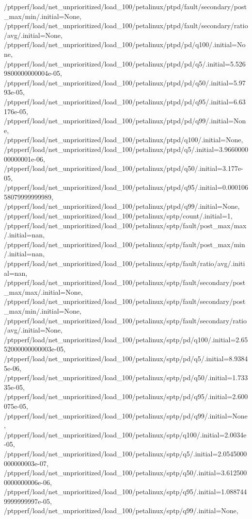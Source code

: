 {    /ptpperf/load/net_unprioritized/load_100/petalinux/ptpd/fault/secondary/post_max/min/.initial=None,
    /ptpperf/load/net_unprioritized/load_100/petalinux/ptpd/fault/secondary/ratio/avg/.initial=None,
    /ptpperf/load/net_unprioritized/load_100/petalinux/ptpd/pd/q100/.initial=None,
    /ptpperf/load/net_unprioritized/load_100/petalinux/ptpd/pd/q5/.initial=5.5269800000000004e-05,
    /ptpperf/load/net_unprioritized/load_100/petalinux/ptpd/pd/q50/.initial=5.9793e-05,
    /ptpperf/load/net_unprioritized/load_100/petalinux/ptpd/pd/q95/.initial=6.63176e-05,
    /ptpperf/load/net_unprioritized/load_100/petalinux/ptpd/pd/q99/.initial=None,
    /ptpperf/load/net_unprioritized/load_100/petalinux/ptpd/q100/.initial=None,
    /ptpperf/load/net_unprioritized/load_100/petalinux/ptpd/q5/.initial=3.966000000000001e-06,
    /ptpperf/load/net_unprioritized/load_100/petalinux/ptpd/q50/.initial=3.177e-05,
    /ptpperf/load/net_unprioritized/load_100/petalinux/ptpd/q95/.initial=0.00010658079999999989,
    /ptpperf/load/net_unprioritized/load_100/petalinux/ptpd/q99/.initial=None,
    /ptpperf/load/net_unprioritized/load_100/petalinux/sptp/count/.initial=1,
    /ptpperf/load/net_unprioritized/load_100/petalinux/sptp/fault/post_max/max/.initial=nan,
    /ptpperf/load/net_unprioritized/load_100/petalinux/sptp/fault/post_max/min/.initial=nan,
    /ptpperf/load/net_unprioritized/load_100/petalinux/sptp/fault/ratio/avg/.initial=nan,
    /ptpperf/load/net_unprioritized/load_100/petalinux/sptp/fault/secondary/post_max/max/.initial=None,
    /ptpperf/load/net_unprioritized/load_100/petalinux/sptp/fault/secondary/post_max/min/.initial=None,
    /ptpperf/load/net_unprioritized/load_100/petalinux/sptp/fault/secondary/ratio/avg/.initial=None,
    /ptpperf/load/net_unprioritized/load_100/petalinux/sptp/pd/q100/.initial=2.6552000000000003e-05,
    /ptpperf/load/net_unprioritized/load_100/petalinux/sptp/pd/q5/.initial=8.93845e-06,
    /ptpperf/load/net_unprioritized/load_100/petalinux/sptp/pd/q50/.initial=1.73335e-05,
    /ptpperf/load/net_unprioritized/load_100/petalinux/sptp/pd/q95/.initial=2.600075e-05,
    /ptpperf/load/net_unprioritized/load_100/petalinux/sptp/pd/q99/.initial=None,
    /ptpperf/load/net_unprioritized/load_100/petalinux/sptp/q100/.initial=2.0034e-05,
    /ptpperf/load/net_unprioritized/load_100/petalinux/sptp/q5/.initial=2.0545000000000003e-07,
    /ptpperf/load/net_unprioritized/load_100/petalinux/sptp/q50/.initial=3.6125000000000006e-06,
    /ptpperf/load/net_unprioritized/load_100/petalinux/sptp/q95/.initial=1.0887449999999997e-05,
    /ptpperf/load/net_unprioritized/load_100/petalinux/sptp/q99/.initial=None,
}
